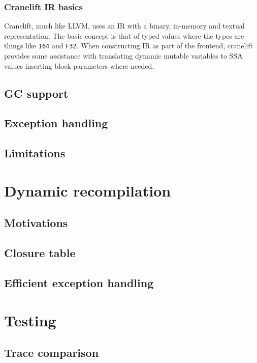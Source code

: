 \subsubsection{Cranelift IR basics}

Cranelift, much like LLVM, uses an IR with a binary, in-memory and textual representation. The
basic concept is that of typed values where the types are things like \texttt{I64} and
\texttt{F32}. When constructing IR as part of the frontend, cranelift provides some assistance with
translating dynamic mutable variables to SSA values inserting block parameters where needed.

\subsection{GC support}

\subsection{Exception handling}

\subsection{Limitations}

\section{Dynamic recompilation} \label{dyn-recomp}

\subsection{Motivations}

\subsection{Closure table}

\subsection{Efficient exception handling}

\section{Testing}

\subsection{Trace comparison}

